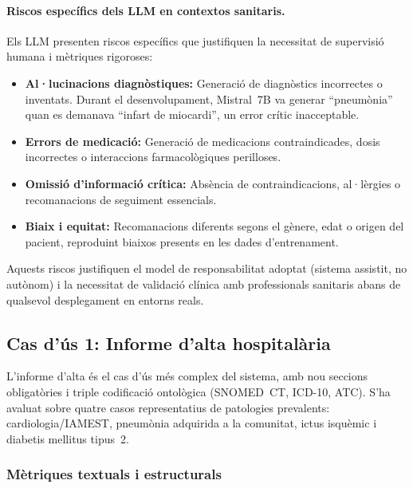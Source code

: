 \documentclass[CAT]{TFUOC}%
\begin{document}
\paragraph{Riscos específics dels LLM en contextos sanitaris.}
Els LLM presenten riscos específics que justifiquen la necessitat de supervisió humana i mètriques rigoroses:
\begin{itemize}
    \item \textbf{Al·lucinacions diagnòstiques:} Generació de diagnòstics incorrectes o inventats. Durant el desenvolupament, Mistral~7B va generar ``pneumònia'' quan es demanava ``infart de miocardi'', un error crític inacceptable.
    \item \textbf{Errors de medicació:} Generació de medicacions contraindicades, dosis incorrectes o interaccions farmacològiques perilloses.
    \item \textbf{Omissió d'informació crítica:} Absència de contraindicacions, al·lèrgies o recomanacions de seguiment essencials.
    \item \textbf{Biaix i equitat:} Recomanacions diferents segons el gènere, edat o origen del pacient, reproduint biaixos presents en les dades d'entrenament.
\end{itemize}

Aquests riscos justifiquen el model de responsabilitat adoptat (sistema assistit, no autònom) i la necessitat de validació clínica amb professionals sanitaris abans de qualsevol desplegament en entorns reals.

\subsection{Cas d'ús 1: Informe d'alta hospitalària}

L'informe d'alta és el cas d'ús més complex del sistema, amb nou seccions obligatòries i triple codificació ontològica (SNOMED~CT, ICD-10, ATC). S'ha avaluat sobre quatre casos representatius de patologies prevalents: cardiologia/IAMEST, pneumònia adquirida a la comunitat, ictus isquèmic i diabetis mellitus tipus~2.

\subsubsection{Mètriques textuals i estructurals}
\end{document}

